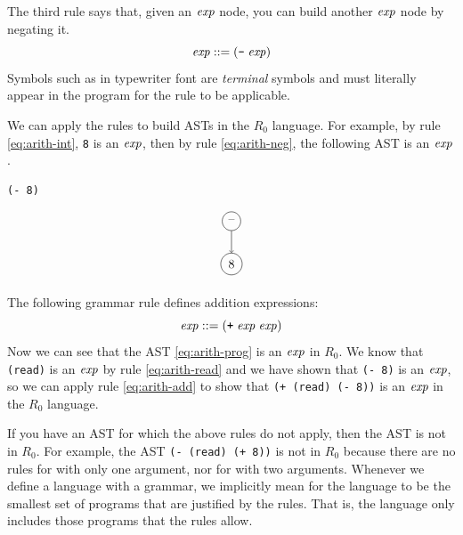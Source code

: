 \documentclass[11pt]{book}
\begin{document}
The third rule says that, given an $\mathit{exp}$ node, you can build another
$\mathit{exp}$ node by negating it.
\begin{equation}
  \mathit{exp} ::= (\texttt{-} \; \mathit{exp})  \label{eq:arith-neg}
\end{equation}
Symbols such as \key{-} in typewriter font are \emph{terminal} symbols
and must literally appear in the program for the rule to be
applicable.

We can apply the rules to build ASTs in the $R_0$
language. For example, by rule \eqref{eq:arith-int}, \texttt{8} is an
$\mathit{exp}$, then by rule \eqref{eq:arith-neg}, the following AST is
an $\mathit{exp}$.
\begin{center}
\begin{minipage}{0.25\textwidth}
\begin{lstlisting}
(- 8)
\end{lstlisting}
\end{minipage}
\begin{minipage}{0.25\textwidth}
\begin{equation}
\begin{tikzpicture}
 \node[draw, circle] (minus) at (0, 0)  {$\text{--}$};
 \node[draw, circle] (8)     at (0, -1.2) {$8$};

 \draw[->] (minus) to (8);
\end{tikzpicture}
\label{eq:arith-neg8}
\end{equation}
\end{minipage}
\end{center}

The following grammar rule defines addition expressions:
\begin{equation}
  \mathit{exp} ::= (\texttt{+} \; \mathit{exp} \; \mathit{exp}) \label{eq:arith-add}
\end{equation}
Now we can see that the AST \eqref{eq:arith-prog} is an $\mathit{exp}$ in
$R_0$.  We know that \lstinline{(read)} is an $\mathit{exp}$ by rule
\eqref{eq:arith-read} and we have shown that \texttt{(- 8)} is an
$\mathit{exp}$, so we can apply rule \eqref{eq:arith-add} to show that
\texttt{(+ (read) (- 8))} is an $\mathit{exp}$ in the $R_0$ language.

If you have an AST for which the above rules do not apply, then the
AST is not in $R_0$. For example, the AST \texttt{(- (read) (+ 8))} is
not in $R_0$ because there are no rules for \key{+} with only one
argument, nor for \key{-} with two arguments.  Whenever we define a
language with a grammar, we implicitly mean for the language to be the
smallest set of programs that are justified by the rules. That is, the
language only includes those programs that the rules allow.
\end{document}
